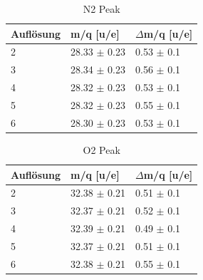 \documentclass[10pt,a4paper]{article}
\begin{document}
\begin{table}[k]
	\centering
	\caption{N2 Peak}
	\label{my-label}
	\begin{tabular}{|l|l|l|}
		\hline
		Auflösung & m/q {[}u/e{]} & $\Delta$m/q {[}u/e{]} \\ \hline
		2         & 28.33 $\pm$ 0.23        & 0.53 $\pm$ 0.1                 \\ \hline
		3         & 28.34 $\pm$ 0.23        & 0.56 $\pm$ 0.1                 \\ \hline
		4         & 28.32 $\pm$ 0.23        & 0.53 $\pm$ 0.1                 \\ \hline
		5         & 28.32 $\pm$ 0.23        & 0.55 $\pm$ 0.1                 \\ \hline
		6         & 28.30 $\pm$ 0.23        & 0.53 $\pm$ 0.1                 \\ \hline
	\end{tabular}
\end{table}
\begin{table}[k]
	\centering
	\caption{O2 Peak}
	\label{my-label}
	\begin{tabular}{|l|l|l|}
		\hline
		Auflösung & m/q {[}u/e{]} & $\Delta$m/q {[}u/e{]} \\ \hline
		2         & 32.38 $\pm$ 0.21         & 0.51 $\pm$ 0.1                 \\ \hline
		3         & 32.37 $\pm$ 0.21         & 0.52 $\pm$ 0.1                 \\ \hline
		4         & 32.39 $\pm$ 0.21         & 0.49 $\pm$ 0.1                 \\ \hline
		5         & 32.37 $\pm$ 0.21         & 0.51 $\pm$ 0.1                 \\ \hline
		6         & 32.38 $\pm$ 0.21         & 0.55 $\pm$ 0.1                 \\ \hline
	\end{tabular}
\end{table}
\end{document}
